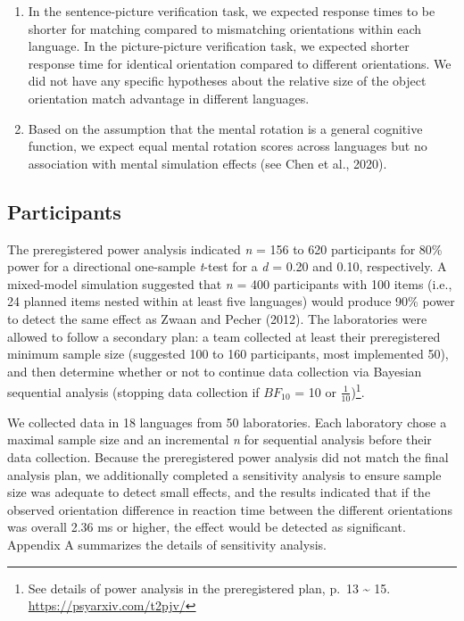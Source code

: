 \documentclass[
  man,floatsintext]{apa7}
\begin{document}
\begin{enumerate}
\def\labelenumi{(\arabic{enumi})}
\item
  In the sentence-picture verification task, we expected response
  times to be shorter for matching compared to mismatching
  orientations within each language. In the picture-picture
  verification task, we expected shorter response time for identical
  orientation compared to different orientations. We did not have any
  specific hypotheses about the relative size of the object
  orientation match advantage in different languages.
\item
  Based on the assumption that the mental rotation is a general
  cognitive function, we expect equal mental rotation scores across
  languages but no association with mental simulation effects (see Chen et al., 2020).
\end{enumerate}

\hypertarget{participants}{%
\subsection{Participants}\label{participants}}

The preregistered power analysis indicated \emph{n} = 156 to 620 participants
for 80\% power for a directional one-sample \emph{t}-test for a \emph{d} = 0.20 and
0.10, respectively. A mixed-model simulation suggested that \emph{n} = 400
participants with 100 items (i.e., 24 planned items nested within at
least five languages) would produce 90\% power to detect the same effect
as Zwaan and Pecher (2012). The laboratories were allowed
to follow a secondary plan: a team collected at least their
preregistered minimum sample size (suggested 100 to 160 participants,
most implemented 50), and then determine whether or not to continue data
collection via Bayesian sequential analysis (stopping data collection if
\(BF_{10}\) = 10 or \(\frac{1}{10}\))\footnote{See details of power analysis in the preregistered plan, p.~13 \textasciitilde{}
  15. \url{https://psyarxiv.com/t2pjv/}}.

We collected data in 18 languages
from 50 laboratories. Each
laboratory chose a maximal sample size and an incremental \emph{n} for
sequential analysis before their data collection. Because the
preregistered power analysis did not match the final analysis plan, we
additionally completed a sensitivity analysis to ensure sample size was
adequate to detect small effects, and the results indicated that if the
observed orientation difference in reaction time between the different
orientations was overall 2.36 ms or higher, the effect would be detected
as significant. Appendix A summarizes the details of sensitivity
analysis.
\end{document}
